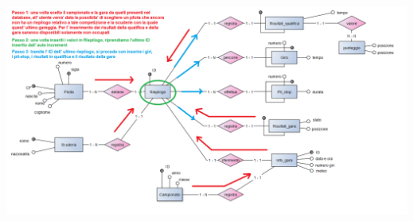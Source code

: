 \documentclass[a4paper,12pt]{report}
\begin{document}
			\begin{center}
					\hspace*{-1cm}%
					\includegraphics[width=\dimexpr\textwidth+10cm\relax, height=17cm, angle=90]{copies/navigazioneRiepilogo.png} 
					\hspace*{-4cm}%
				\end{center}
\end{document}
